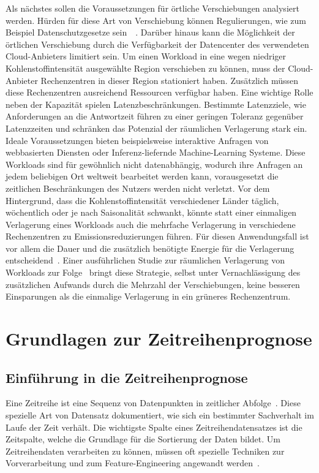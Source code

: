 Als nächstes sollen die Voraussetzungen für örtliche Verschiebungen analysiert werden.
Hürden für diese Art von Verschiebung können Regulierungen, wie zum Beispiel Datenschutzgesetze sein~\cite{Sukprasert.2023}~\cite{Koningstein.18.5.2021}.
Darüber hinaus kann die Möglichkeit der örtlichen Verschiebung durch die Verfügbarkeit der Datencenter des verwendeten Cloud-Anbieters limitiert sein.
Um einen Workload in eine wegen niedriger Kohlenstoffintensität ausgewählte Region verschieben zu können, muss der Cloud-Anbieter Rechenzentren in dieser Region stationiert haben.
Zusätzlich müssen diese Rechenzentren ausreichend Ressourcen verfügbar haben.
Eine wichtige Rolle neben der Kapazität spielen Latenzbeschränkungen.
Bestimmte Latenzziele, wie Anforderungen an die Antwortzeit führen zu einer geringen Toleranz gegenüber Latenzzeiten und schränken das Potenzial der räumlichen Verlagerung stark ein.
Ideale Voraussetzungen bieten beispielsweise interaktive Anfragen von webbasierten Diensten oder Inferenz-liefernde Machine-Learning Systeme.
Diese Workloads sind für gewöhnlich nicht datenabhängig, wodurch ihre Anfragen an jedem beliebigen Ort weltweit bearbeitet werden kann, vorausgesetzt die zeitlichen Beschränkungen des Nutzers werden nicht verletzt.
Vor dem Hintergrund, dass die Kohlenstoffintensität verschiedener Länder täglich, wöchentlich oder je nach Saisonalität schwankt, könnte statt einer einmaligen Verlagerung eines Workloads auch die mehrfache Verlagerung in verschiedene Rechenzentren zu Emissionsreduzierungen führen.
Für diesen Anwendungsfall ist vor allem die Dauer und die zusätzlich benötigte Energie für die Verlagerung entscheidend~\cite{Sukprasert.2023}.
Einer ausführlichen Studie zur räumlichen Verlagerung von Workloads zur Folge~\cite{Sukprasert.2023} bringt diese Strategie, selbst unter Vernachlässigung des zusätzlichen Aufwands durch die Mehrzahl der Verschiebungen, keine besseren Einsparungen als die einmalige Verlagerung in ein grüneres Rechenzentrum.
\chapter{Grundlagen zur Zeitreihenprognose}
\section{Einführung in die Zeitreihenprognose}\label{CAP:intor-time-series-forecasting}
Eine Zeitreihe ist eine Sequenz von Datenpunkten in zeitlicher Abfolge~\cite{Peixeiro.2022}.
Diese spezielle Art von Datensatz dokumentiert, wie sich ein bestimmter Sachverhalt im Laufe der Zeit verhält.
Die wichtigste Spalte eines Zeitreihendatensatzes ist die Zeitspalte, welche die Grundlage für die Sortierung der Daten bildet.
Um Zeitreihendaten verarbeiten zu können, müssen oft spezielle Techniken zur Vorverarbeitung und zum Feature-Engineering angewandt werden~\cite{Lazzeri.2021}.

